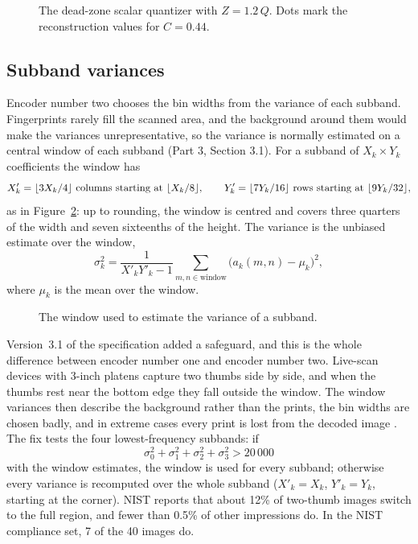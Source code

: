 \begin{figure}[ht]
  \centering
  
  \caption{The dead-zone scalar quantizer with $Z = 1.2\,Q$. Dots mark the reconstruction
  values for $C = 0.44$.}
  \label{fig:quantizer}
\end{figure}

\subsection{Subband variances}
\label{sec:variance}

Encoder number two chooses the bin widths from the variance of each subband. Fingerprints
rarely fill the scanned area, and the background around them would make the variances
unrepresentative, so the variance is normally estimated on a central window of each subband
(Part 3, Section 3.1). For a subband of $X_k \times Y_k$ coefficients the window has
\begin{equation}
  X'_k = \lfloor 3X_k/4 \rfloor \text{ columns starting at } \lfloor X_k/8 \rfloor, \qquad
  Y'_k = \lfloor 7Y_k/16 \rfloor \text{ rows starting at } \lfloor 9Y_k/32 \rfloor,
  \label{eq:window}
\end{equation}
as in Figure~\ref{fig:window}: up to rounding, the window is centred and covers three quarters
of the width and seven sixteenths of the height. The variance is the unbiased estimate over the
window,
\begin{equation}
  \sigma_k^2 = \frac{1}{X'_kY'_k - 1}\sum_{m,n \in \text{window}} \bigl(a_k(m,n) - \mu_k\bigr)^2,
  \label{eq:variance}
\end{equation}
where $\mu_k$ is the mean over the window.

\begin{figure}[ht]
  \centering
  
  \caption{The window used to estimate the variance of a subband.}
  \label{fig:window}
\end{figure}

Version~3.1 of the specification added a safeguard, and this is the whole difference between
encoder number one and encoder number two. Live-scan devices with 3-inch platens capture two
thumbs side by side, and when the thumbs rest near the bottom edge they fall outside the
window. The window variances then describe the background rather than the prints, the bin
widths are chosen badly, and in extreme cases every print is lost from the decoded image
\cite{nistnotice}. The fix tests the
four lowest-frequency subbands: if
\begin{equation}
  \sigma_0^2 + \sigma_1^2 + \sigma_2^2 + \sigma_3^2 > 20\,000
\end{equation}
with the window estimates, the window is used for every subband; otherwise every variance is
recomputed over the whole subband ($X'_k = X_k$, $Y'_k = Y_k$, starting at the corner). NIST
reports that about 12\% of two-thumb images switch to the full region, and fewer than 0.5\% of
other impressions do. In the NIST compliance set, 7 of the 40 images do.

